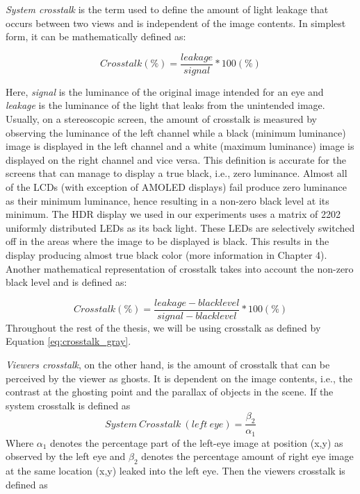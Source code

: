\emph{System crosstalk} is the term used to define the amount of light leakage that occurs between two views and is independent of the image contents. In simplest form, it can be mathematically defined as:

\begin{equation}
Crosstalk(\%) = \frac{leakage}{signal} *100 (\%)
\label{eq:simple_crosstalk}
\end{equation}

Here, \emph{signal} is the luminance of the original image intended for an eye and \emph{leakage} is the luminance of the light that leaks from the unintended image. Usually, on a stereoscopic screen, the amount of crosstalk is measured by observing the luminance of the left channel while a black (minimum luminance) image is displayed in the left channel and a white (maximum luminance) image is displayed on the right channel and vice versa. This definition is accurate for the screens that can manage to display a true black, i.e., zero luminance. Almost all of the LCDs (with exception of AMOLED displays) fail produce zero luminance as their minimum luminance, hence resulting in a non-zero black level at its minimum. The HDR display we used in our experiments uses a matrix of 2202 uniformly distributed LEDs as its back light. These LEDs are selectively switched off in the areas where the image to be displayed is black. This results in the display producing almost true black color (more information in Chapter 4). Another mathematical representation of crosstalk takes into account the non-zero black level and is defined as:

\begin{equation}
Crosstalk(\%) = \frac{leakage - black level}{signal - black level} *100 (\%)
\label{eq:crosstalk_gray}
\end{equation}
Throughout the rest of the thesis, we will be using crosstalk as defined by Equation \ref{eq:crosstalk_gray}.

\emph{Viewers crosstalk}, on the other hand, is the amount of crosstalk that can be perceived by the viewer as ghosts. It is dependent on the image contents, i.e., the contrast at the ghosting point and the parallax of objects in the scene. If the system crosstalk is defined as
\begin{equation}
System\ Crosstalk\ (left\ eye) = \frac{\beta_2}{\alpha_1}
\label{eq:system_ct}
\end{equation}
Where \(\alpha_1\) denotes the percentage part of the left-eye image at position (x,y) as observed by the left eye and \(\beta_2\) denotes the percentage amount of right eye image at the same location (x,y) leaked into the left eye. Then the viewers crosstalk is defined as

